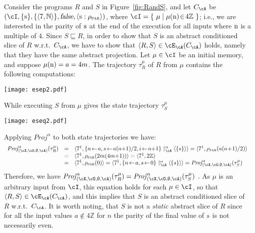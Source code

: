 \documentclass[prodmode,acmtocl]{acmsmall}
\newcommand{\caX}{\cX}
\def\progr{\ensuremath{R}\xspace}
\def\progss{\ensuremath{S}\xspace}
\def\trace{\ensuremath{\tau}\xspace}
\def\memory{\ensuremath{\mu}\xspace}
\newcommand{\BIND}[2]{#1\!\leftarrow\!#2}
\def\crit{\ensuremath{C}\xspace}
\def\uco{\ensuremath{\rho}\xspace}
\newcommand{\ABSMEM}[3]{#1 \upharpoonright^\alpha_{#3} #2}
\def\Proj{\ensuremath{\mathit{Proj}}\xspace}
\newcommand{\false}{\mbox{\sl false}}
\def\tuple#1{\langle #1 \rangle}
\newcommand{\0}{\mbox{\bf 0}}
\newcommand{\CODE}[1]{\ensuremath{\mbox{\lstinline!#1!}\xspace}\xspace}
\def\nn{\CODE{n}}
\def\ss{\CODE{s}}
\def\NATURALS{\mathbb{N}}
\def\PARDOM{\ensuremath{\uco_{\textsc{par}}}\xspace}
\begin{document}
\begin{example}
  Consider the programs $\progr$ and $\progss$ in
  Figure~\ref{fig:RandS}, and let $\crit_{\cA}$ be $(\cI,
  \{\mbox{\ss}\},\{\tuple{7,\NATURALS}\},\false,\tuple{\ss:\PARDOM})$,
  where $\cI =
  \{~\memory\mid\memory(\mbox{\nn})\!\in\!4\mathbb{Z}~\}$; i.e., we
  are interested in the parity of \ss at the end of the execution for
  all inputs where \nn is a multiple of $4$.  Since
  $\progss{\sqsubseteq}\progr$, in order to show that $\progss$ is an
  abstract conditioned slice of $\progr$ w.r.t.~$\crit_{\cA}$, we have
  to show that $\tuple{\progr,\progss} \in \cE_{\cA}(\crit_{\cA})$
  holds, namely that they have the same abstract projection.  Let
  $\memory \in \cI$ be an initial memory, and suppose
  $\memory(\mbox{\nn}) = a = 4m$.  The trajectory
  $\trace_\progr^\memory$ of $\progr$ from $\memory$ contains the
  following computations:
   \begin{center}
\texttt{[image: esep2.pdf]}
\end{center}
While executing $\progss$ from $\memory$ gives the state
  trajectory $\trace_\progss^\memory$
   \begin{center}
\texttt{[image: eseq2.pdf]}
\end{center}
  Applying $\Proj^\alpha$ to both state trajectories we have:
  \[
  \begin{array}{rcl}
    \Proj^\alpha_{(\caX,\cO,\emptyset,\cA)}(\trace_\progr^\memory) 
    & = &\tuple{7^1, \ABSMEM{\{ \BIND{n}{a}, \BIND{s}{a(a{+}1)/2},
      \BIND{i}{a{+}1} \}}{\tuple{\{s\}}}{\cA}} 
     =  \tuple{7^1, \PARDOM(a(a\!+\!1)/2)} \\
     &=&  \tuple{7^1, \PARDOM(2m(4m{+}1))} = \tuple{7^1, 2\mathbb{Z}} \\
     &=& \tuple{7^1, \PARDOM(0)} =\tuple{7^1, \ABSMEM{\{ \BIND{n}{a}, \BIND{s}{0}
    \}}{\tuple{\{s\}}}{\cA}} 
    =\Proj^\alpha_{(\caX,\cO,\emptyset,\cA)}(\trace_\progss^\memory)
  \end{array}
  \]
  Therefore, we have
  $\Proj^\alpha_{(\caX,\cO,\emptyset,\cA)}(\trace_\progr^\memory) =
  \Proj^\alpha_{(\caX,\cO,\emptyset,\cA)}(\trace_\progss^\memory)$ .
  As $\memory$ is an arbitrary input from $\cI$, this equation holds
  for each $\memory \in \cI$, so that $\tuple{\progr,\progss} \in
  \cE_{\cA}(\crit_{\cA})$, and this implies that $\progss$ is an
  abstract conditioned slice of $\progr$ w.r.t.~$\crit_{\cA}$. It is
  worth noting, that $\progss$ is not a {\em static} abstract slice of
  $\progr$ since for all the input values $a\notin 4\mathbb{Z}$ for
  $n$ the parity of the final value of \ss is not necessarily even.
\end{example}
\end{document}
